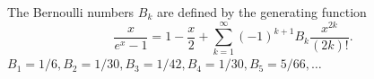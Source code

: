 The Bernoulli numbers $B_k$ are defined by the generating function
$$\frac{x}{e^x - 1} = 1 - \frac{x}{2} + \sum_{k=1}^{\infty} (-1)^{k+1} B_k \frac{x^{2k}}{(2k)!}.$$
$B_1 = 1/6, B_2 = 1/30, B_3 = 1/42, B_4 = 1/30, B_5 = 5/66, \ldots$
